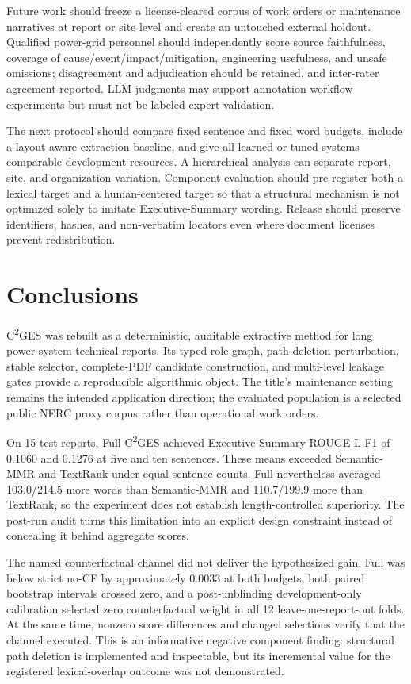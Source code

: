 \documentclass[applsci,article,submit,moreauthors]{Definitions/mdpi}
\newcommand{\cges}{C\textsuperscript{2}GES}
\begin{document}
Future work should freeze a license-cleared corpus of work orders or maintenance narratives at report or site level and create an untouched external holdout. Qualified power-grid personnel should independently score source faithfulness, coverage of cause/event/impact/mitigation, engineering usefulness, and unsafe omissions; disagreement and adjudication should be retained, and inter-rater agreement reported. LLM judgments may support annotation workflow experiments but must not be labeled expert validation.

The next protocol should compare fixed sentence and fixed word budgets, include a layout-aware extraction baseline, and give all learned or tuned systems comparable development resources. A hierarchical analysis can separate report, site, and organization variation. Component evaluation should pre-register both a lexical target and a human-centered target so that a structural mechanism is not optimized solely to imitate Executive-Summary wording. Release should preserve identifiers, hashes, and non-verbatim locators even where document licenses prevent redistribution.

\section{Conclusions}

\cges{} was rebuilt as a deterministic, auditable extractive method for long power-system technical reports. Its typed role graph, path-deletion perturbation, stable selector, complete-PDF candidate construction, and multi-level leakage gates provide a reproducible algorithmic object. The title's maintenance setting remains the intended application direction; the evaluated population is a selected public NERC proxy corpus rather than operational work orders.

On 15 test reports, Full \cges{} achieved Executive-Summary ROUGE-L F1 of 0.1060 and 0.1276 at five and ten sentences. These means exceeded Semantic-MMR and TextRank under equal sentence counts. Full nevertheless averaged 103.0/214.5 more words than Semantic-MMR and 110.7/199.9 more than TextRank, so the experiment does not establish length-controlled superiority. The post-run audit turns this limitation into an explicit design constraint instead of concealing it behind aggregate scores.

The named counterfactual channel did not deliver the hypothesized gain. Full was below strict no-CF by approximately 0.0033 at both budgets, both paired bootstrap intervals crossed zero, and a post-unblinding development-only calibration selected zero counterfactual weight in all 12 leave-one-report-out folds. At the same time, nonzero score differences and changed selections verify that the channel executed. This is an informative negative component finding: structural path deletion is implemented and inspectable, but its incremental value for the registered lexical-overlap outcome was not demonstrated.
\end{document}
